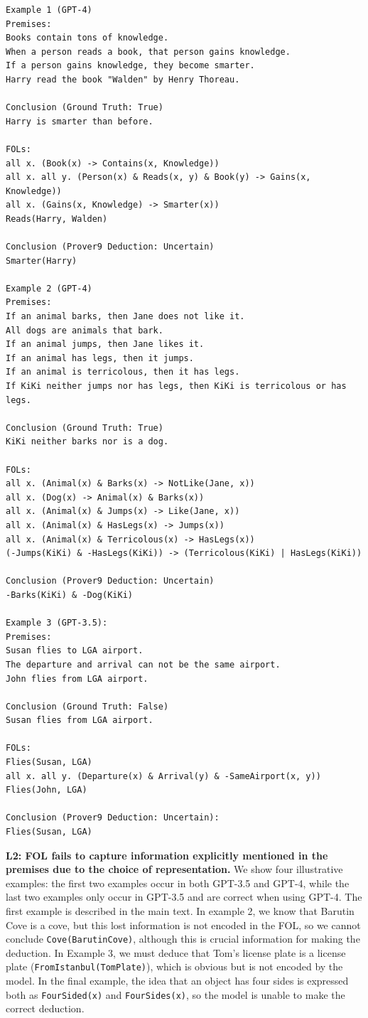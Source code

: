 \begin{lstlisting}[breaklines=true]
Example 1 (GPT-4)
Premises:
Books contain tons of knowledge.
When a person reads a book, that person gains knowledge.
If a person gains knowledge, they become smarter.
Harry read the book "Walden" by Henry Thoreau.

Conclusion (Ground Truth: True)
Harry is smarter than before.

FOLs:
all x. (Book(x) -> Contains(x, Knowledge))
all x. all y. (Person(x) & Reads(x, y) & Book(y) -> Gains(x, Knowledge))
all x. (Gains(x, Knowledge) -> Smarter(x))
Reads(Harry, Walden)

Conclusion (Prover9 Deduction: Uncertain)
Smarter(Harry)

Example 2 (GPT-4)
Premises:
If an animal barks, then Jane does not like it.
All dogs are animals that bark.
If an animal jumps, then Jane likes it.
If an animal has legs, then it jumps.
If an animal is terricolous, then it has legs.
If KiKi neither jumps nor has legs, then KiKi is terricolous or has legs.

Conclusion (Ground Truth: True)
KiKi neither barks nor is a dog.

FOLs:
all x. (Animal(x) & Barks(x) -> NotLike(Jane, x))
all x. (Dog(x) -> Animal(x) & Barks(x))
all x. (Animal(x) & Jumps(x) -> Like(Jane, x))
all x. (Animal(x) & HasLegs(x) -> Jumps(x))
all x. (Animal(x) & Terricolous(x) -> HasLegs(x))
(-Jumps(KiKi) & -HasLegs(KiKi)) -> (Terricolous(KiKi) | HasLegs(KiKi))

Conclusion (Prover9 Deduction: Uncertain)
-Barks(KiKi) & -Dog(KiKi)

Example 3 (GPT-3.5):
Premises:
Susan flies to LGA airport.
The departure and arrival can not be the same airport.
John flies from LGA airport.

Conclusion (Ground Truth: False)
Susan flies from LGA airport.

FOLs:
Flies(Susan, LGA)
all x. all y. (Departure(x) & Arrival(y) & -SameAirport(x, y))
Flies(John, LGA)

Conclusion (Prover9 Deduction: Uncertain):
Flies(Susan, LGA)
\end{lstlisting}

\textbf{L2: FOL fails to capture information explicitly mentioned in the premises due to the choice of representation.}
We show four illustrative examples: the first two examples occur in both GPT-3.5 and GPT-4, while the last two examples only occur in GPT-3.5 and are correct when using GPT-4. The first example is described in the main text. In example 2, we know that Barutin Cove is a cove, but this lost information is not encoded in the FOL, so we cannot conclude \texttt{Cove(BarutinCove)}, although this is crucial information for making the deduction. In Example 3, we must deduce that Tom's license plate is a license plate (\texttt{FromIstanbul(TomPlate)}), which is obvious but is not encoded by the model. In the final example, the idea that an object has four sides is expressed both as \texttt{FourSided(x)} and \texttt{FourSides(x)}, so the model is unable to make the correct deduction.

